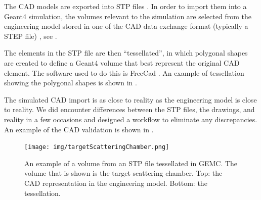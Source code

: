 The CAD models are exported into STP files \cite{stepFiles}.
In order to import them into a Geant4 simulation, the volumes relevant to the simulation are selected from the engineering
model stored in one of the CAD data exchange format (typically a STEP file) \cite{cadExchange}, see .


The elements in the STP file are then ``tessellated'', in which polygonal shapes are created to define a Geant4 volume
that best represent the original CAD element.
The software used to do this is FreeCad \cite{freeCad}. An example of tessellation showing the polygonal shapes
is shown in .

The simulated CAD import is as close to reality as the engineering model is close to reality.
We did encounter differences between the STP files, the drawings, and reality in a few occasions and designed
a workflow to eliminate any discrepancies.
An example of the CAD validation is shown in .

\begin{figure}
	\centering
	\texttt{[image: img/targetScatteringChamber.png]}
	\caption{An example of a volume from an STP file tessellated in GEMC. The volume that is shown is the target scattering chamber.
            Top: the CAD representation in the engineering model. Bottom: the tessellation. }
	\label{fig:targetScatteringChamber}
\end{figure}




